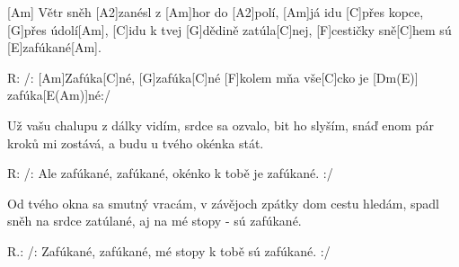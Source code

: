 
[Am] Větr sněh [A2]zanésl z [Am]hor do [A2]polí,
[Am]já idu [C]přes kopce, [G]přes údolí[Am],
[C]idu k tvej [G]dědině zatúla[C]nej,
[F]cestičky sně[C]hem sú [E]zafúkané[Am].

R: /: [Am]Zafúka[C]né, [G]zafúka[C]né 
[F]kolem mňa vše[C]cko je [Dm(E)] zafúka[E(Am)]né:/

Už vašu chalupu z dálky vidím,
srdce sa ozvalo, bit ho slyším,
snáď enom pár kroků mi zostává,
a budu u tvého okénka stát.

R: /: Ale zafúkané, zafúkané,
okénko k tobě je zafúkané. :/

Od tvého okna sa smutný vracám,
v závějoch zpátky dom cestu hledám,
spadl sněh na srdce zatúlané,
aj na mé stopy - sú zafúkané.

R.: /: Zafúkané, zafúkané,
mé stopy k tobě sú zafúkané. :/ 

